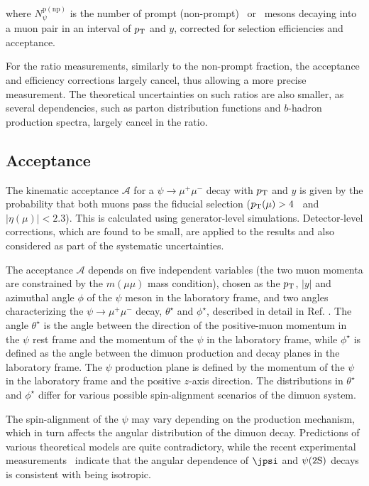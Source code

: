 \noindent where $N_{\psi}^{\mathrm{p(np)}}$ is the number of prompt (non-prompt) \jpsi\ or \psiprime\ mesons decaying into a 
muon pair in an interval of $\mbox{$p_{\text{T}}$}$ and $y$, corrected for selection efficiencies and acceptance.

For the ratio measurements, similarly to the non-prompt fraction, the acceptance and efficiency corrections 
largely cancel, thus allowing a more precise measurement.
The theoretical uncertainties on such ratios are also smaller, as several dependencies, such as
parton distribution functions and $b$-hadron production spectra, largely cancel in the ratio.

\subsection{Acceptance}

The kinematic acceptance $\mathcal{A}$ for a $\psi \rightarrow \mu^+\mu^-$ decay with $\mbox{$p_{\text{T}}$}$ and $y$ is given by the 
probability that both muons pass the fiducial selection ($\mbox{$p_{\text{T}}$}(\mu)>4$ \GeV\ and $|\eta(\mu)|<2.3$).
This is calculated using generator-level simulations. 
Detector-level corrections, which are found to be small, are applied to the 
results and also considered as part of the systematic uncertainties. 

The acceptance $\mathcal{A}$ depends on five independent variables (the two muon momenta are constrained by the
$m(\mu\mu)$ mass condition), chosen as the $\mbox{$p_{\text{T}}$}$, $|y|$ and azimuthal angle $\phi$ of the $\psi$ meson in the laboratory frame,
and two angles
characterizing the $\psi \rightarrow \mu^+\mu^-$ decay, $\theta^{\star}$ and $\phi^{\star}$, described in detail in Ref. \cite{Faccioli:2010kd}.
The angle $\theta^{\star}$ is the angle between the direction of the positive-muon momentum in the $\psi$ rest frame
and the momentum of the $\psi$ in the laboratory frame, while $\phi^{\star}$ is defined as the angle between the dimuon 
production and decay planes in the laboratory frame. 
The $\psi$ production plane is defined by the momentum of the $\psi$ in the laboratory frame and the positive $z$-axis direction.
The distributions in $\theta^{\star}$ and $\phi^{\star}$ 
differ for various possible spin-alignment scenarios of the dimuon system.

The spin-alignment of the $\psi$ may vary depending on the production mechanism, which in turn affects the angular distribution of the dimuon decay.
Predictions of various theoretical models are quite contradictory, while the recent experimental measurements~\cite{Chatrchyan:2013cla} indicate that the angular dependence of $\jpsi$ and $\psi(2\mathrm{S})$
decays is consistent with being isotropic.  

